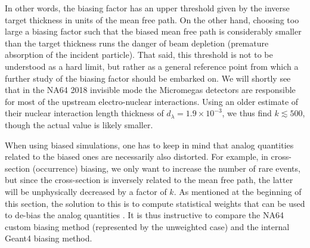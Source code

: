 %
In other words, the biasing factor has an upper threshold given by the inverse target thickness in units of the mean free path. On the other hand, choosing too large a biasing factor such that the biased mean free path is considerably smaller than the target thickness runs the danger of beam depletion (premature absorption of the incident particle). That said, this threshold is not to be understood as a hard limit, but rather as a general reference point from which a further study of the biasing factor should be embarked on. We will shortly see that in the NA64 2018 invisible mode the Micromegas detectors are responsible for most of the upstream electro-nuclear interactions. Using an older estimate of their nuclear interaction length thickness of $d_{\lambda} = 1.9 \times 10^{-3}$, we thus find $k \lesssim 500$, though the actual value is likely smaller.

When using biased simulations, one has to keep in mind that analog quantities related to the biased ones are necessarily also distorted. For example, in cross-section (occurrence) biasing, we only want to increase the number of rare events, but since the cross-section is inversely related to the mean free path, the latter will be unphysically decreased by a factor of $k$. As mentioned at the beginning of this section, the solution to this is to compute statistical weights that can be used to de-bias the analog quantities \cite{G4bias,Mendenhall_2012}. It is thus instructive to compare the NA64 custom biasing method (represented by the unweighted case) and the internal Geant4 biasing method.

